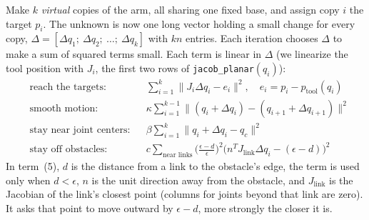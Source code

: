 \begin{center}
\end{center}

Make $k$ \emph{virtual} copies of the arm, all sharing one fixed base, and
assign copy $i$ the target $p_i$. The unknown is now one long vector holding
a small change for every copy,
$\Delta = [\Delta q_1;\ \Delta q_2;\ \dots;\ \Delta q_k]$ with $kn$ entries.
Each iteration chooses $\Delta$ to make a sum of squared terms small. Each
term is linear in $\Delta$ (we linearize the tool position with $J_i$, the
first two rows of \texttt{jacob\_planar}$(q_i)$):
\begin{align}
&\text{reach the targets:} && \textstyle\sum_{i=1}^{k} \|J_i\Delta q_i - e_i\|^2, \quad e_i = p_i - p_{\text{tool}}(q_i)\\
&\text{smooth motion:} && \textstyle\kappa\sum_{i=1}^{k-1}\|(q_i+\Delta q_i)-(q_{i+1}+\Delta q_{i+1})\|^2\\
&\text{stay near joint centers:} && \textstyle\beta\sum_{i=1}^{k}\|q_i+\Delta q_i-q_c\|^2\\
&\text{stay off obstacles:} && \textstyle c\sum_{\text{near links}}\Big(\tfrac{\epsilon-d}{\epsilon}\Big)^2\big(n^T J_{\text{link}}\Delta q_i-(\epsilon-d)\big)^2
\end{align}
In term~(5), $d$ is the distance from a link to the obstacle's edge, the term
is used only when $d<\epsilon$, $n$ is the unit direction away from the
obstacle, and $J_{\text{link}}$ is the Jacobian of the link's closest point
(columns for joints beyond that link are zero). It asks that point to move
outward by $\epsilon-d$, more strongly the closer it is.


